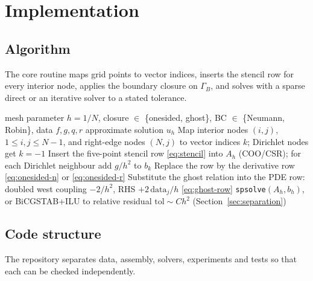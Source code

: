 \documentclass[11pt,a4paper]{article}
\begin{document}
\section{Implementation}
\label{sec:impl}

\subsection{Algorithm}

The core routine maps grid points to vector indices, inserts the stencil row
for every interior node, applies the boundary closure on $\Gamma_B$, and
solves with a sparse direct or an iterative solver to a stated tolerance.

\begin{algorithm}[H]
\caption{Assembly of $A_h$ and the right-hand side (mixed-BC Poisson)}
\label{alg:main}
\begin{algorithmic}[1]
\Require mesh parameter $h = 1/N$, closure $\in$ \{onesided, ghost\},
BC $\in$ \{Neumann, Robin\}, data $f, g, q, r$
\Ensure approximate solution $u_h$
\State Map interior nodes $(i,j)$, $1 \le i,j \le N-1$, and right-edge
nodes $(N,j)$ to vector indices $k$; Dirichlet nodes get $k = -1$
    \State Insert the five-point stencil row \eqref{eq:stencil} into
    $A_h$ (COO/CSR); for each Dirichlet neighbour add $g/h^2$ to $b_k$
\EndFor
{}
        \State Replace the row by the derivative row
        \eqref{eq:onesided-n} or \eqref{eq:onesided-r}
    \Else
        \State Substitute the ghost relation into the PDE row:
        doubled west coupling $-2/h^2$, RHS $+ 2\,\mathrm{data}_j/h$
        \eqref{eq:ghost-row}
    \EndIf
\EndFor
\State \Return \texttt{spsolve}$(A_h, b_h)$, or BiCGSTAB+ILU to
relative residual $\mathrm{tol} \sim C h^2$ (Section~\ref{sec:separation})
\end{algorithmic}
\end{algorithm}

\subsection{Code structure}

The repository separates data, assembly, solvers, experiments and tests so
that each can be checked independently.
\end{document}
